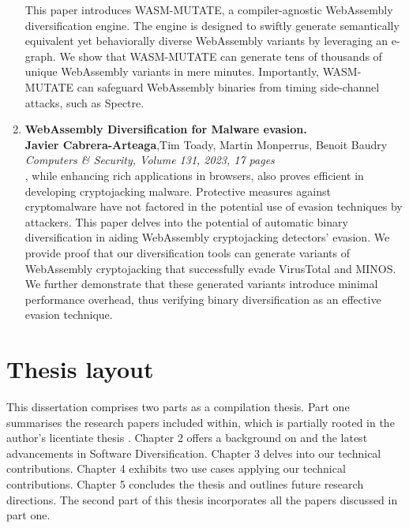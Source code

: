 \begin{enumerate}[label={\textbf{P\arabic*}:}, ref={P\arabic*}]
	This paper introduces WASM-MUTATE, a compiler-agnostic WebAssembly diversification engine. 
	The engine is designed to swiftly generate semantically equivalent yet behaviorally diverse WebAssembly variants by leveraging an e-graph. 
	We show that WASM-MUTATE can generate tens of thousands of unique WebAssembly variants in mere minutes. 
	Importantly, WASM-MUTATE can safeguard WebAssembly binaries from timing side-channel attacks, such as Spectre.



	\item \label{evasionpaper} \textbf{WebAssembly Diversification for Malware evasion.} \\ 
	\textbf{Javier Cabrera-Arteaga},Tim Toady, Martin Monperrus, Benoit Baudry\\
	\textit{Computers \& Security, Volume 131, 2023, 17 pages} \\
	  \Wasm, while enhancing rich applications in browsers, also proves efficient in developing cryptojacking malware. 
	Protective measures against cryptomalware have not factored in the potential use of evasion techniques by attackers. 
	This paper delves into the potential of automatic binary diversification in aiding WebAssembly cryptojacking detectors' evasion. 
	We provide proof that our diversification tools can generate variants of WebAssembly cryptojacking that successfully evade VirusTotal and MINOS. 
	We further demonstrate that these generated variants introduce minimal performance overhead, thus verifying binary diversification as an effective evasion technique.

\end{enumerate}



\section*{Thesis layout}
This dissertation comprises two parts as a compilation thesis. 
Part one summarises the research papers included within, which is partially rooted in the author's licentiate thesis \cite{Lic}. 
Chapter 2 offers a background on \Wasm and the latest advancements in Software Diversification. 
Chapter 3 delves into our technical contributions. 
Chapter 4 exhibits two use cases applying our technical contributions. 
Chapter 5 concludes the thesis and outlines future research directions. 
The second part of this thesis incorporates all the papers discussed in part one.

